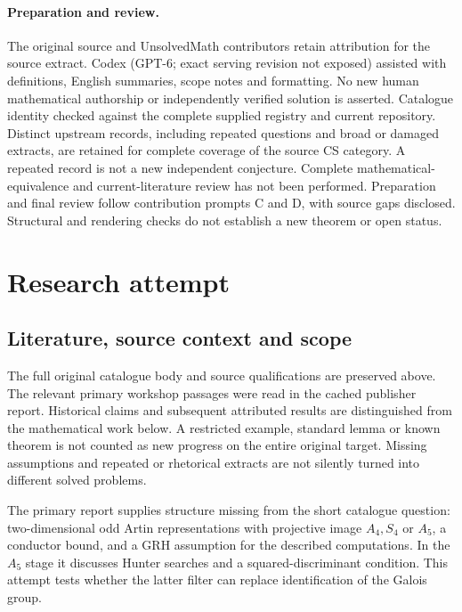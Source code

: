 \documentclass[11pt]{article}
\begin{document}
\paragraph{Preparation and review.}
The original source and UnsolvedMath contributors retain attribution for the source extract. Codex (GPT-6; exact serving revision not exposed) assisted with definitions, English summaries, scope notes and formatting. No new human mathematical authorship or independently verified solution is asserted. Catalogue identity checked against the complete supplied registry and current repository. Distinct upstream records, including repeated questions and broad or damaged extracts, are retained for complete coverage of the source CS category. A repeated record is not a new independent conjecture. Complete mathematical-equivalence and current-literature review has not been performed. Preparation and final review follow contribution prompts C and D, with source gaps disclosed. Structural and rendering checks do not establish a new theorem or open status.
\label{end:statement}

\section{Research attempt}
\subsection{Literature, source context and scope}
The full original catalogue body and source qualifications are preserved above. The relevant primary workshop passages were read in the cached publisher report. Historical claims and subsequent attributed results are distinguished from the mathematical work below. A restricted example, standard lemma or known theorem is not counted as new progress on the entire original target. Missing assumptions and repeated or rhetorical extracts are not silently turned into different solved problems.

The primary report supplies structure missing from the short catalogue question: two-dimensional odd Artin representations with projective image $A_4,S_4$ or $A_5$, a conductor bound, and a GRH assumption for the described computations. In the $A_5$ stage it discusses Hunter searches and a squared-discriminant condition. This attempt tests whether the latter filter can replace identification of the Galois group.
\end{document}
